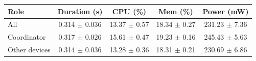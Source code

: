 \begin{tabular}{lcccc}
\hline
\textbf{Role} & \textbf{Duration (s)} & \textbf{CPU (\%)} & \textbf{Mem (\%)} & \textbf{Power (mW)} \\
\hline
All & 0.314 $\pm$ 0.036 & 13.37 $\pm$ 0.57 & 18.34 $\pm$ 0.27 & 231.23 $\pm$ 7.36 \\
Coordinator & 0.317 $\pm$ 0.026 & 15.61 $\pm$ 0.47 & 19.23 $\pm$ 0.16 & 245.43 $\pm$ 5.63 \\
Other devices & 0.314 $\pm$ 0.036 & 13.28 $\pm$ 0.36 & 18.31 $\pm$ 0.21 & 230.69 $\pm$ 6.86 \\
\hline
\end{tabular}
